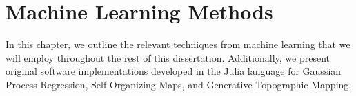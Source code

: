 \chapter{Machine Learning Methods}

In this chapter, we outline the relevant techniques from machine learning that we will employ throughout the rest of this dissertation. Additionally, we present original software implementations developed in the Julia language for Gaussian Process Regression, Self Organizing Maps, and Generative Topographic Mapping.










